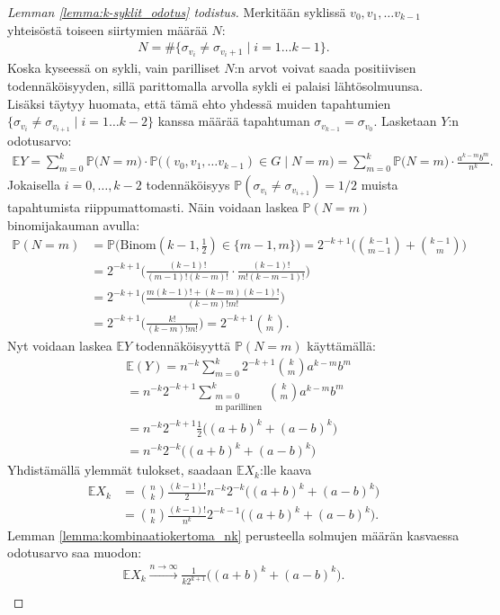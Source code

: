 \documentclass[finnish,12pt,a4paper,pdftex,sci,utf8]{aaltothesis}
\begin{document}
\begin{proof}[Lemman \ref{lemma:k-syklit_odotus} todistus]
	Merkitään syklissä $v_0, v_1, \ldots v_{k-1}$ yhteisöstä toiseen siirtymien määrää $N$:
	\begin{align*}
		N = \#\{\sigma_{v_i} \neq \sigma_{v_i+1} \mid i = 1 \ldots k-1 \}. 
	\end{align*}
	Koska kyseessä on sykli, vain parilliset $N$:n arvot voivat saada positiivisen todennäköisyyden, sillä parittomalla arvolla sykli ei palaisi lähtösolmuunsa. Lisäksi täytyy huomata, että tämä ehto yhdessä muiden tapahtumien $\{\sigma_{v_i} \neq \sigma_{v_{i+1}} \mid i = 1 \ldots k-2\}$ kanssa määrää tapahtuman $\sigma_{v_{k-1}} = \sigma_{v_0}$. 
	Lasketaan $Y$:n odotusarvo:
	\begin{align*}
		\mathbb{E}Y = \sum^{k}_{m=0}\mathbb{P}\big(N=m\big) \cdot \mathbb{P}\big((v_0, v_1, \ldots v_{k-1}) \in G \mid N=m\big)
		= \sum^{k}_{m=0}\mathbb{P}\big(N=m\big) \cdot  \frac{a^{k-m}b^{m}}{n^{k}}.
	\end{align*}
	Jokaisella $i = 0, \ldots , k-2$ todennäköisyys $\mathbb{P}(\sigma_{v_i} \neq \sigma_{v_{i+1}}) = 1/2$ muista tapahtumista riippumattomasti. Näin voidaan laskea $\mathbb{P}(N = m)$ binomijakauman avulla: 
	\begin{align*}
		\mathbb{P}(N = m) &= \mathbb{P}\big(\text{Binom}(k-1, \frac{1}{2}) \in \{m-1, m\}\big)
		= 2^{-k+1}\Bigg(\binom{k-1}{m-1} + \binom{k-1}{m}\Bigg) \\
		&= 2^{-k+1}\Bigg(\frac{(k-1)!}{(m-1)!(k-m)!} \cdot \frac{(k-1)!}{m!(k-m-1)!}\Bigg) \\
		&= 2^{-k+1}\Bigg(\frac{m(k-1)! + (k-m)(k-1)!}{(k-m)!m!}\Bigg) \\
		&= 2^{-k+1}\Bigg(\frac{k!}{(k-m)!m!}\Bigg) = 2^{-k+1}\binom{k}{m}.
	\end{align*}
	Nyt voidaan laskea $\mathbb{E} Y$ todennäköisyyttä $\mathbb{P}(N = m)$ käyttämällä:
	\begin{align*}
		&\mathbb{E}(Y) = n^{-k} \sum^{k}_{m=0} 2^{-k+1}\binom{k}{m} a^{k-m}b^{m} \\
		&= n^{-k} 2^{-k+1} \sum_{\substack{m=0 \\ \text{m parillinen}}}^k \binom{k}{m}a^{k-m}b^{m} \\
		&= n^{-k} 2^{-k+1} \frac{1}{2} \big((a+b)^k + (a-b)^k \big) \\
		&= n^{-k} 2^{-k} \big((a+b)^k + (a-b)^k \big)
	\end{align*}
	Yhdistämällä ylemmät tulokset, saadaan $\mathbb{E}X_k$:lle kaava
	\begin{align*}
		\mathbb{E}X_k &= \binom{n}{k}\frac{(k-1)!}{2}  n^{-k} 2^{-k} \big((a+b)^k + (a-b)^k \big) \\
		&= \binom{n}{k}\frac{(k-1)!}{n^{k}} 2^{-k-1} \big((a+b)^k + (a-b)^k \big).
	\end{align*}
 	Lemman \ref{lemma:kombinaatiokertoma_nk} perusteella solmujen määrän kasvaessa odotusarvo saa muodon:
	\begin{align*}
		\mathbb{E}X_k \xrightarrow{n \rightarrow \infty} \frac{1}{k2^{k+1}} \big((a+b)^k + (a-b)^k \big). \\
	\end{align*}
\end{proof}
\end{document}
